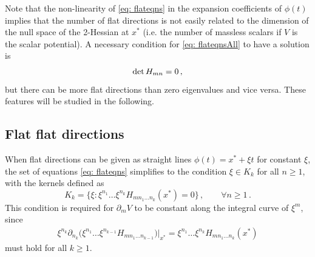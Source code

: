 \documentclass[11pt]{article}
\begin{document}
Note that the non-linearity of \eqref{eq: flateqns} in the expansion coefficients of $\phi(t)$ implies that the number of flat directions is not easily related to the dimension of the null space of the 2-Hessian at $x^*$ (i.e. the number of massless scalars if $V$ is the scalar potential). A necessary condition for \eqref{eq: flateqnsAll} to have a solution is
%
\begin{equation}
	\det H_{mn}=0\,,		\\[5pt]
\end{equation}
%
but there can be more flat directions than zero eigenvalues and vice versa. These features will be studied in the following.

\subsection{Flat flat directions} \label{sec: FFC}


When flat directions can be given as straight lines $\phi(t)=x^*+\xi t$ for constant $\xi$, the set of equations \eqref{eq: flateqns} simplifies to the condition $\xi\in K_k$ for all $n\geq1$, with the kernels defined as
%
\begin{equation}	\label{eq: flatness}
	K_k=\{\xi: \xi^{n_1}\dots\xi^{n_{k}}H_{mn_1\dots n_{k}}(x^*)=0\}\,,	\qquad \forall n\geq1\,.
\end{equation}
%
This condition is required for $\partial_mV$ to be constant along the integral curve of $\xi^m$, since
%
\begin{equation}
	\begin{aligned}
		\xi^{n_k}\partial_{n_k}\big(\xi^{n_1}\dots\xi^{n_{k-1}}H_{mn_1\dots n_{k-1}}\big)\big\vert_{x^*}
		=\xi^{n_1}\dots\xi^{n_{k}}H_{mn_1\dots n_{k}}(x^*)
	\end{aligned}
\end{equation}
%
must hold for all $k\geq1$.
\end{document}
